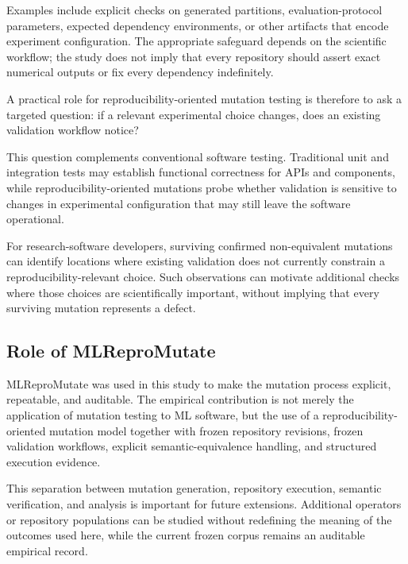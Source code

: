 Examples include explicit checks on generated partitions, evaluation-protocol
parameters, expected dependency environments, or other artifacts that encode
experiment configuration. The appropriate safeguard depends on the scientific
workflow; the study does not imply that every repository should assert exact
numerical outputs or fix every dependency indefinitely.

A practical role for reproducibility-oriented mutation testing is therefore to
ask a targeted question: if a relevant experimental choice changes, does an
existing validation workflow notice?

This question complements conventional software testing. Traditional unit and
integration tests may establish functional correctness for APIs and components,
while reproducibility-oriented mutations probe whether validation is sensitive
to changes in experimental configuration that may still leave the software
operational.

For research-software developers, surviving confirmed non-equivalent mutations
can identify locations where existing validation does not currently constrain a
reproducibility-relevant choice. Such observations can motivate additional
checks where those choices are scientifically important, without implying that
every surviving mutation represents a defect.


\subsection{Role of MLReproMutate}
\label{sec:discussion-tool}

MLReproMutate was used in this study to make the mutation process explicit,
repeatable, and auditable. The empirical contribution is not merely the
application of mutation testing to ML software, but the use of a
reproducibility-oriented mutation model together with frozen repository
revisions, frozen validation workflows, explicit semantic-equivalence handling,
and structured execution evidence.

This separation between mutation generation, repository execution, semantic
verification, and analysis is important for future extensions. Additional
operators or repository populations can be studied without redefining the
meaning of the outcomes used here, while the current frozen corpus remains an
auditable empirical record.
